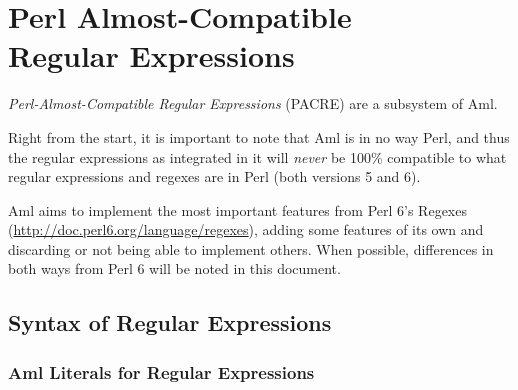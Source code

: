 
\chapter[Perl Almost-Compatible Regular Expressions]{Perl Almost-Compatible\\ Regular Expressions}
\label{sec:pacre}

\minitoc

\newpage





{\em Perl-Almost-Compatible Regular Expressions} (PACRE) are a subsystem of Aml. 

Right from the start, it is important to note that Aml is in no way Perl, and thus the regular expressions as integrated in it will {\em never} be 100\% compatible to what regular expressions and regexes are in Perl (both versions 5 and 6). 

Aml aims to implement the most important features from Perl 6's Regexes (\url{http://doc.perl6.org/language/regexes}), adding some features of its own and discarding or not being able to implement others. When possible, differences in both ways from Perl 6 will be noted in this document. 





\section{Syntax of Regular Expressions} 
\label{sec:syntax-of-regexps}







\subsection{Aml Literals for Regular Expressions}
\label{sec:literals-for-regexps}

